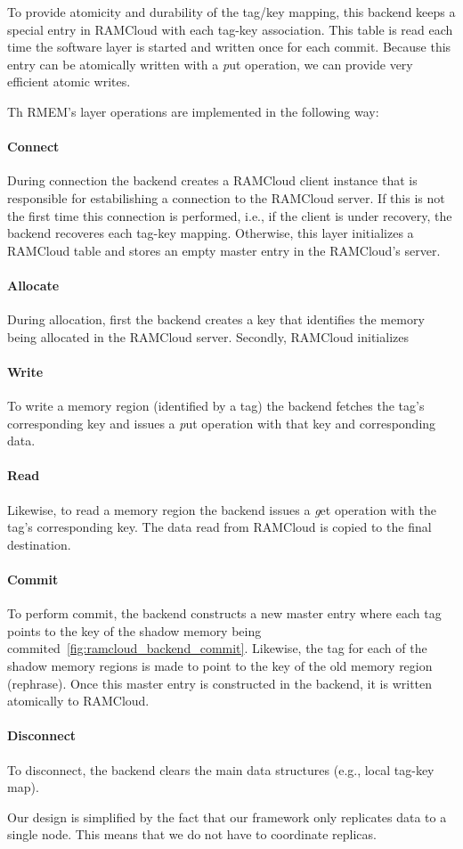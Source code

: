 To provide atomicity and durability of the tag/key mapping, this backend keeps a special entry in RAMCloud with each tag-key association. This table is read each time the software layer is started and written once for each commit. Because this entry can be atomically written with a {\emph put} operation, we can provide very efficient atomic writes.

Th RMEM's layer operations are implemented in the following way:

\paragraph {\bf Connect} During connection the backend creates a RAMCloud client instance that is responsible for estabilishing a connection to the RAMCloud server.
If this is not the first time this connection is performed, i.e., if the client is under recovery, the backend recoveres each tag-key mapping.
Otherwise, this layer initializes a RAMCloud table and stores an empty master entry in the RAMCloud's server.
\paragraph{\bf Allocate} During allocation, first the backend creates a key that identifies the memory being allocated in the RAMCloud server. Secondly, RAMCloud initializes
\paragraph{\bf Write} To write a memory region (identified by a tag) the backend fetches the tag's corresponding key and issues a {\emph put } operation with that key and corresponding data.
\paragraph{\bf Read} Likewise, to read a memory region the backend issues a {\emph get} operation with the tag's corresponding key. The data read from RAMCloud is copied to the final destination.
\paragraph{\bf Commit} To perform commit, the backend constructs a new master entry where each tag points to the key of the shadow memory being commited~\ref{fig:ramcloud_backend_commit}. Likewise, the tag for each of the shadow
memory regions is made to point to the key of the old memory region (rephrase). Once this master entry is constructed in the backend, it is written atomically to RAMCloud.
\paragraph{\bf Disconnect} To disconnect, the backend clears the main data structures (e.g., local tag-key map).

Our design is simplified by the fact that our framework only replicates data to a single node. This means that we do not have to coordinate replicas.
